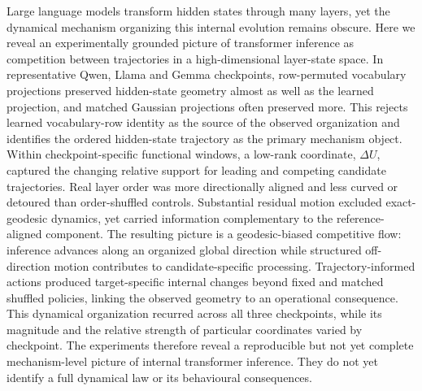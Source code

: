 Large language models transform hidden states through many layers, yet the dynamical mechanism organizing this internal evolution remains obscure. Here we reveal an experimentally grounded picture of transformer inference as competition between trajectories in a high-dimensional layer-state space. In representative Qwen, Llama and Gemma checkpoints, row-permuted vocabulary projections preserved hidden-state geometry almost as well as the learned projection, and matched Gaussian projections often preserved more. This rejects learned vocabulary-row identity as the source of the observed organization and identifies the ordered hidden-state trajectory as the primary mechanism object. Within checkpoint-specific functional windows, a low-rank coordinate, \(\Delta U\), captured the changing relative support for leading and competing candidate trajectories. Real layer order was more directionally aligned and less curved or detoured than order-shuffled controls. Substantial residual motion excluded exact-geodesic dynamics, yet carried information complementary to the reference-aligned component. The resulting picture is a geodesic-biased competitive flow: inference advances along an organized global direction while structured off-direction motion contributes to candidate-specific processing. Trajectory-informed actions produced target-specific internal changes beyond fixed and matched shuffled policies, linking the observed geometry to an operational consequence. This dynamical organization recurred across all three checkpoints, while its magnitude and the relative strength of particular coordinates varied by checkpoint. The experiments therefore reveal a reproducible but not yet complete mechanism-level picture of internal transformer inference. They do not yet identify a full dynamical law or its behavioural consequences.

